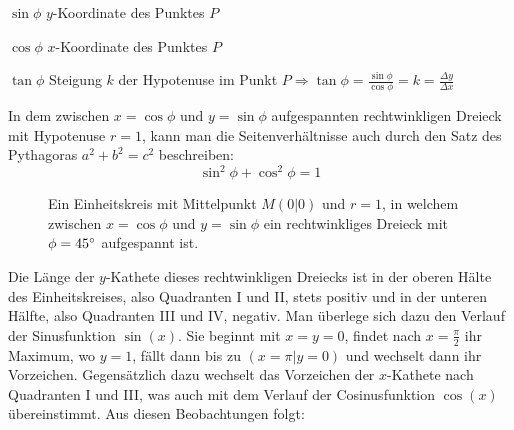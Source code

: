 $\sin \phi$  $y$-Koordinate des Punktes $P$

$\cos \phi$  $x$-Koordinate des Punktes $P$

$\tan \phi$  Steigung $k$ der Hypotenuse im Punkt $P \Rightarrow \tan \phi = \frac{\sin \phi}{\cos \phi} = k = \frac{\Delta y}{\Delta x}$

In dem zwischen $x = \cos \phi$ und $y = \sin \phi$ aufgespannten rechtwinkligen Dreieck mit Hypotenuse $r = 1$, kann man die Seitenverh\"{a}ltnisse auch durch den Satz des Pythagoras $a^2 + b^2 = c^2$ beschreiben: $$\sin^2 \phi + \cos^2 \phi = 1$$

\pagebreak

\begin{figure}[t!]
\centering
	\caption*{Ein Einheitskreis mit Mittelpunkt $M (0 | 0)$ und $r = 1$, in welchem zwischen $x = \cos \phi$ und $y = \sin \phi$ ein rechtwinkliges Dreieck mit $\phi = 45\degree$ aufgespannt ist.}
\end{figure}

Die L\"{a}nge der $y$-Kathete dieses rechtwinkligen Dreiecks ist in der oberen H\"{a}lte des Einheitskreises, also Quadranten I und II, stets positiv und in der unteren H\"{a}lfte, also Quadranten III und IV, negativ. Man \"{u}berlege sich dazu den Verlauf der Sinusfunktion $\sin(x)$. Sie beginnt mit $x = y = 0$, findet nach $x = \frac{\pi}{2}$ ihr Maximum, wo $y = 1$, f\"{a}llt dann bis zu $(x = \pi | y = 0)$ und wechselt dann ihr Vorzeichen. Gegens\"{a}tzlich dazu wechselt das Vorzeichen der $x$-Kathete nach Quadranten I und III, was auch mit dem Verlauf der Cosinusfunktion $\cos(x)$ \"{u}bereinstimmt. Aus diesen Beobachtungen folgt:

